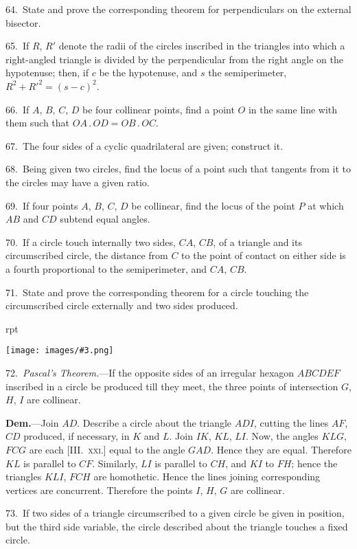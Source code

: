 \documentclass[oneside]{book}
\newcounter{wrapwidth}
\newcommand\imgflow[3]{
\setcounter{wrapwidth}{#1}
\begin{wrapfigure}[#2]{r}{\value{wrapwidth}pt}
\begin{center}
\vspace{-0.3in}
\texttt{[image: images/\#3.png]}
\end{center}
\end{wrapfigure}
}
\begin{document}
\begin{footnotesize}
64.~State and prove the corresponding theorem for perpendiculars
on the external bisector.

65.~If $R$, $R'$ denote the radii of the circles inscribed in the
triangles into which a right-angled triangle is divided by the perpendicular
from the right angle on the hypotenuse; then, if $c$ be
the hypotenuse, and $s$ the semiperimeter, $R^{2} + R'^{2} = (s-c)^{2}$.

66.~If $A$, $B$, $C$, $D$ be four collinear points, find a point $O$ in
the same line with them such that $OA\,.\,OD = OB\,.\,OC$.

67.~The four sides of a cyclic quadrilateral are given; construct
it.

68.~Being given two circles, find the locus of a point such
that tangents from it to the circles may have a given ratio.

69.~If four points $A$, $B$, $C$, $D$ be collinear, find the locus of the
point $P$ at which $AB$ and $CD$ subtend equal angles.

70.~If a circle touch internally two sides, $CA$, $CB$, of a triangle
and its circumscribed circle, the distance from $C$ to the point of
contact on either side is a fourth proportional to the semiperimeter,
and $CA$, $CB$.

71.~State and prove the corresponding theorem for a circle
touching the circumscribed circle externally and two sides produced.

\imgflow{170}{28}{f214}

72.~\emph{Pascal's Theorem.}---If the opposite sides of an irregular
hexagon $ABCDEF$ inscribed in a circle be produced till they
meet, the three points of intersection $G$, $H$, $I$ are collinear.

\textbf{Dem.}---Join $AD$. Describe a circle about the triangle $ADI$,
cutting the lines $AF$, $CD$ produced, if necessary, in $K$ and $L$.
Join $IK$, $KL$, $LI$. Now,
the angles $KLG$, $FCG$ are
each [III\@.~\textsc{xxi.}] equal to
the angle $GAD$. Hence they
are equal. Therefore $KL$ is
parallel to $CF$. Similarly,
$LI$ is parallel to $CH$, and
$KI$ to $FH$; hence the triangles
$KLI$, $FCH$ are homothetic.
Hence the lines
joining corresponding vertices
are concurrent. Therefore
the points $I$, $H$, $G$ are
collinear.

73.~If two sides of a triangle
circumscribed to a
given circle be given in
position, but the third side
variable, the circle described
about the triangle touches a
fixed circle.


\end{footnotesize}
\end{document}
